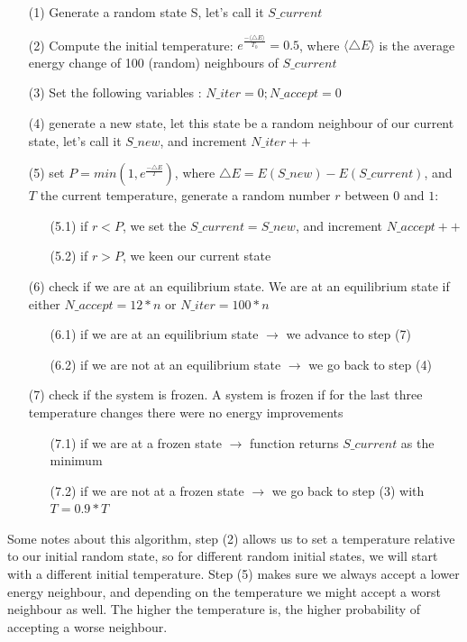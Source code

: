 \documentclass[a4paper]{article}
\begin{document}
\begin{itemize}
\item[(1)] Generate a random state S, let's call it $S\_current$
\item[(2)] Compute the initial temperature: $e^{\frac{- \langle \triangle E \rangle}{T_{0}}} = 0.5$, where $\langle \triangle E \rangle$ is the average energy change of 100 (random) neighbours of $S\_current$
\item[(3)] Set the following variables : $N\_iter = 0; N\_accept = 0$
\item[(4)] generate a new state, let this state be a random neighbour of our current state, let's call it $S\_new$, and increment $N\_iter ++$
\item[(5)] set $P = min(1, e^{\frac{- \triangle E}{T}})$, where $\triangle E = E(S\_new) - E(S\_current)$, and $T$ the current temperature, generate a random number $r$ between $0$ and $1$:
\begin{itemize} 
\item[(5.1)] if $r < P$, we set the $S\_current = S\_new$, and increment $N\_accept ++$
\item[(5.2)] if $r > P$, we keen our current state
\end{itemize}
\item[(6)] check if we are at an equilibrium state. We are at an equilibrium state if either $N\_accept = 12*n$ or $N\_iter = 100*n$
\begin{itemize} 
\item[(6.1)] if we are at an equilibrium state $\longrightarrow$ we advance to step (7)
\item[(6.2)] if we are not at an equilibrium state $\longrightarrow$ we go back to step (4)
\end{itemize}
\item[(7)] check if the system is frozen. A system is frozen if for the last three temperature changes there were no energy improvements
\begin{itemize} 
\item[(7.1)] if we are at a frozen state $\longrightarrow$ function returns $S\_current$ as the minimum
\item[(7.2)] if we are not at a frozen state $\longrightarrow$ we go back to step (3) with $T = 0.9*T$
\end{itemize}
\end{itemize}
Some notes about this algorithm, step (2) allows us to set a temperature relative to our initial random state, so for different random initial states, we will start with a different initial temperature. Step (5) makes sure we always accept a lower energy neighbour, and depending on the temperature we might accept a worst neighbour as well. The higher the temperature is, the higher probability of accepting a worse neighbour. 
\end{document}
